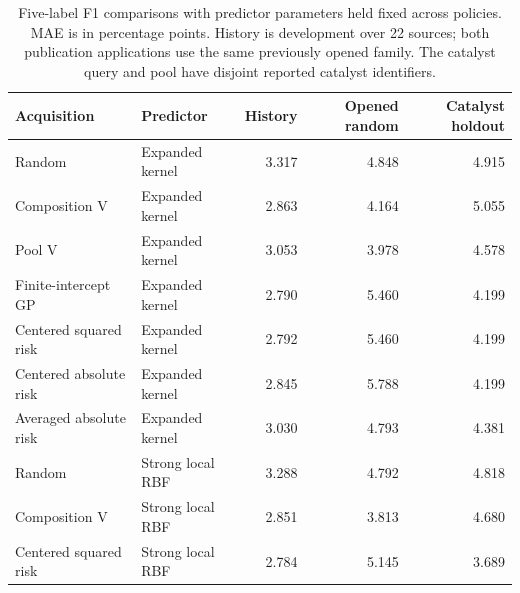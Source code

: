 \begin{table}[htbp]\centering\small
\caption{Five-label F1 comparisons with predictor parameters held fixed across policies. MAE is in percentage points. History is development over 22 sources; both publication applications use the same previously opened family. The catalyst query and pool have disjoint reported catalyst identifiers.}\label{tab:step10matched}
\begin{tabular}{llrrr}\toprule
Acquisition & Predictor & History & Opened random & Catalyst holdout \\ \midrule
Random & Expanded kernel & 3.317 & 4.848 & 4.915 \\
Composition V & Expanded kernel & 2.863 & 4.164 & 5.055 \\
Pool V & Expanded kernel & 3.053 & 3.978 & 4.578 \\
Finite-intercept GP & Expanded kernel & 2.790 & 5.460 & 4.199 \\
Centered squared risk & Expanded kernel & 2.792 & 5.460 & 4.199 \\
Centered absolute risk & Expanded kernel & 2.845 & 5.788 & 4.199 \\
Averaged absolute risk & Expanded kernel & 3.030 & 4.793 & 4.381 \\
Random & Strong local RBF & 3.288 & 4.792 & 4.818 \\
Composition V & Strong local RBF & 2.851 & 3.813 & 4.680 \\
Centered squared risk & Strong local RBF & 2.784 & 5.145 & 3.689 \\
\bottomrule\end{tabular}
\end{table}
